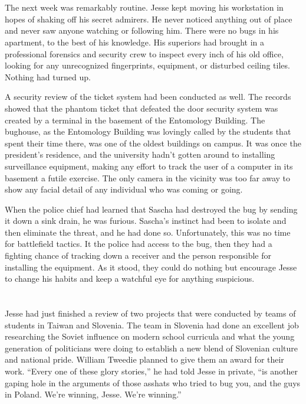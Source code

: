 \documentclass[12pt]{book}
\begin{document}
\chapter{}

The next week was remarkably routine.  Jesse kept moving his workstation in hopes of shaking off his secret admirers.  He never noticed anything out of place and never saw anyone watching or following him.  There were no bugs in his apartment, to the best of his knowledge.  His superiors had brought in a professional forensics and security crew to inspect every inch of his old office, looking for any unrecognized fingerprints, equipment, or disturbed ceiling tiles.  Nothing had turned up.

A security review of the ticket system had been conducted as well.  The records showed that the phantom ticket that defeated the door security system was created by a terminal in the basement of the Entomology Building.  The bughouse, as the Entomology Building was lovingly called by the students that spent their time there, was one of the oldest buildings on campus.  It was once the president's residence, and the university hadn't gotten around to installing surveillance equipment, making any effort to track the user of a computer in its basement a futile exercise.  The only camera in the vicinity was too far away to show any facial detail of any individual who was coming or going.

When the police chief had learned that Sascha had destroyed the bug by sending it down a sink drain, he was furious.  Sascha's instinct had been to isolate and then eliminate the threat, and he had done so.  Unfortunately, this was no time for battlefield tactics.  It the police had access to the bug, then they had a fighting chance of tracking down a receiver and the person responsible for installing the equipment.  As it stood, they could do nothing but encourage Jesse to change his habits and keep a watchful eye for anything suspicious.

\chapter{}

Jesse had just finished a review of two projects that were conducted by teams of students in Taiwan and Slovenia.  The team in Slovenia had done an excellent job researching the Soviet influence on modern school curricula and what the young generation of politicians were doing to establish a new blend of Slovenian culture and national pride.  William Tweedie planned to give them an award for their work.  ``Every one of these glory stories,'' he had told Jesse in private, ``is another gaping hole in the arguments of those asshats who tried to bug you, and the guys in Poland.  We're winning, Jesse.  We're winning.''
\end{document}
